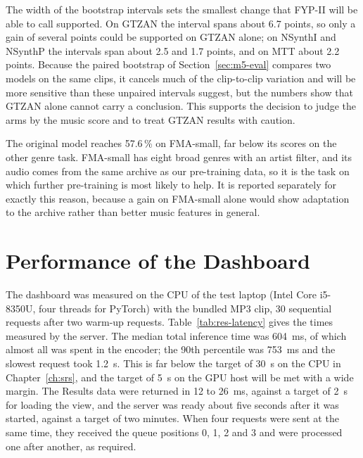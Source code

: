 The width of the bootstrap intervals sets the smallest change that FYP-II will be able to call supported. On GTZAN the interval spans about 6.7 points, so only a gain of several points could be supported on GTZAN alone; on NSynthI and NSynthP the intervals span about 2.5 and 1.7 points, and on MTT about 2.2 points. Because the paired bootstrap of Section~\ref{sec:m5-eval} compares two models on the same clips, it cancels much of the clip-to-clip variation and will be more sensitive than these unpaired intervals suggest, but the numbers show that GTZAN alone cannot carry a conclusion. This supports the decision to judge the arms by the music score and to treat GTZAN results with caution.

The original model reaches 57.6\,\% on FMA-small, far below its scores on the other genre task. FMA-small has eight broad genres with an artist filter, and its audio comes from the same archive as our pre-training data, so it is the task on which further pre-training is most likely to help. It is reported separately for exactly this reason, because a gain on FMA-small alone would show adaptation to the archive rather than better music features in general.

\section{Performance of the Dashboard}
\label{sec:res-dash}
The dashboard was measured on the CPU of the test laptop (Intel Core i5-8350U, four threads for PyTorch) with the bundled MP3 clip, 30 sequential requests after two warm-up requests. Table~\ref{tab:res-latency} gives the times measured by the server. The median total inference time was 604~ms, of which almost all was spent in the encoder; the 90th percentile was 753~ms and the slowest request took 1.2~s. This is far below the target of 30~s on the CPU in Chapter~\ref{ch:srs}, and the target of 5~s on the GPU host will be met with a wide margin. The Results data were returned in 12 to 26~ms, against a target of 2~s for loading the view, and the server was ready about five seconds after it was started, against a target of two minutes. When four requests were sent at the same time, they received the queue positions 0, 1, 2 and 3 and were processed one after another, as required.

